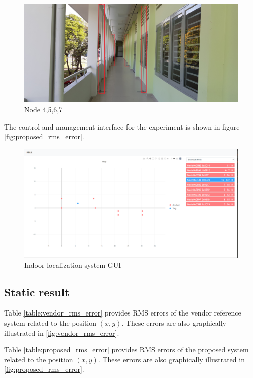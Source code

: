 \documentclass[\main/main.tex]{subfiles}
\begin{document}
\begin{figure}[H]      
    \centering
    \includegraphics[width=1\textwidth]{arena_03.jpg}
    \caption{Node 4,5,6,7}
    \label{fig:node_4_5_6_7}
\end{figure}

The control and management interface for the experiment is shown in figure \ref{fig:proposed_rms_error}.
\begin{figure}[H]   
    \centering
    \includegraphics[width=1\textwidth]{result_gui.png}
    \caption{Indoor localization system GUI}
    \label{fig:result_gui}
\end{figure}

\subsection{Static result}

Table \ref{table:vendor_rms_error} provides RMS errors of the vendor reference system related to the position $(x,y)$. These errors are also graphically illustrated in \ref{fig:vendor_rms_error}.

Table \ref{table:proposed_rms_error} provides RMS errors of the proposed system related to the position $(x,y)$. These errors are also graphically illustrated in \ref{fig:proposed_rms_error}.
\end{document}
